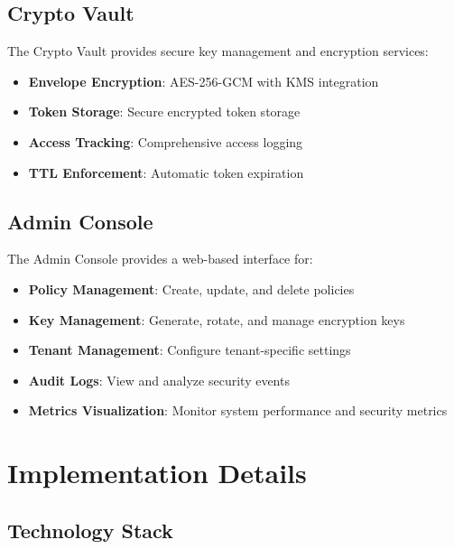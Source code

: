 \documentclass[12pt]{article}
\begin{document}
\subsection{Crypto Vault}

The Crypto Vault provides secure key management and encryption services:

\begin{itemize}
    \item \textbf{Envelope Encryption}: AES-256-GCM with KMS integration
    \item \textbf{Token Storage}: Secure encrypted token storage
    \item \textbf{Access Tracking}: Comprehensive access logging
    \item \textbf{TTL Enforcement}: Automatic token expiration
\end{itemize}

\subsection{Admin Console}

The Admin Console provides a web-based interface for:

\begin{itemize}
    \item \textbf{Policy Management}: Create, update, and delete policies
    \item \textbf{Key Management}: Generate, rotate, and manage encryption keys
    \item \textbf{Tenant Management}: Configure tenant-specific settings
    \item \textbf{Audit Logs}: View and analyze security events
    \item \textbf{Metrics Visualization}: Monitor system performance and security metrics
\end{itemize}

\section{Implementation Details}

\subsection{Technology Stack}
\end{document}
